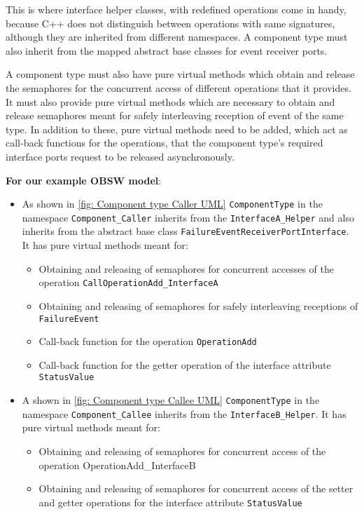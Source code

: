 This is where interface helper classes, with redefined operations come in handy, because C++ does not distinguish between operations with same signatures, although they are inherited from different namespaces. A component type must also inherit from the mapped abstract base classes for event receiver ports.

A component type must also have pure virtual methods which obtain and release the semaphores for the concurrent access of different operations that it provides. It must also provide pure virtual methods which are necessary to obtain and release semaphores meant for safely interleaving reception of event of the same type. In addition to these, pure virtual methods need to be added, which act as call-back functions for the operations, that the component type's required interface ports request to be released asynchronously.   

\textbf{For our example OBSW model}:
\begin{itemize}
\item As shown in \cref{fig: Component type Caller UML} \texttt{ComponentType} in the namespace \texttt{Component\_Caller} inherits from the \texttt{InterfaceA\allowbreak\_Helper} and also inherits from the abstract base class \texttt{FailureEvent\allowbreak ReceiverPort\allowbreak Interface}. 
It has pure virtual methods meant for:

\begin{itemize}
\item Obtaining and releasing of semaphores for concurrent accesses of the operation \texttt{CallOperationAdd\allowbreak\_InterfaceA}
\item Obtaining and releasing of semaphores for safely interleaving receptions of \texttt{FailureEvent}
\item Call-back function for the operation \texttt{OperationAdd}
\item Call-back function for the getter operation of the interface attribute \texttt{StatusValue} 
\end{itemize}

\item A shown in \cref{fig: Component type Callee UML} \texttt{ComponentType} in the namespace \texttt{Component\_Callee} inherits from the \texttt{InterfaceB\allowbreak\_Helper}. 
It has pure virtual methods meant for:

\begin{itemize}
\item Obtaining and releasing of semaphores for concurrent access of the operation {OperationAdd\allowbreak\_InterfaceB}
\item Obtaining and releasing of semaphores for concurrent access of the setter and getter operations for the interface attribute \texttt{StatusValue}
\end{itemize}   
\end{itemize}

